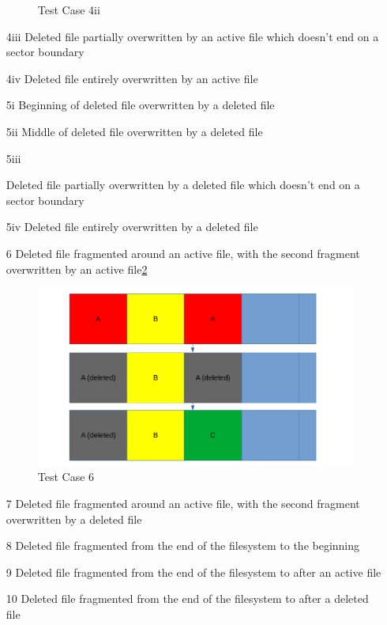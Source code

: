 \begin{itemize}
\begin{figure}[h]
        \caption{Test Case 4ii}
        \label{fig:case_4ii}
    \end{figure}
    \item [4iii]
 Deleted file partially overwritten by an active file which doesn't end on a sector boundary
    \item [4iv]
 Deleted file entirely overwritten by an active file
    \item [5i]
 Beginning of deleted file overwritten by a deleted file
    \item [5ii]
 Middle of deleted file overwritten by a deleted file
    \item [5iii]

 Deleted file partially overwritten by a deleted file which doesn't end on a sector boundary
    \item [5iv]
 Deleted file entirely overwritten by a deleted file
    \item [6]
 Deleted file fragmented around an active file, with the second fragment overwritten by an active file\ref{fig:case_6}
    \begin{figure}[h]
        \centering
        \includegraphics[width=\linewidth]{fig/case6.png}
        \caption{Test Case 6}
        \label{fig:case_6}
    \end{figure}
    \item [7]
 Deleted file fragmented around an active file, with the second fragment overwritten by a deleted file
    \item [8]
 Deleted file fragmented from the end of the filesystem to the beginning
    \item [9]
 Deleted file fragmented from the end of the filesystem to after an active file
    \item [10]
 Deleted file fragmented from the end of the filesystem to after a deleted file
\end{itemize}


